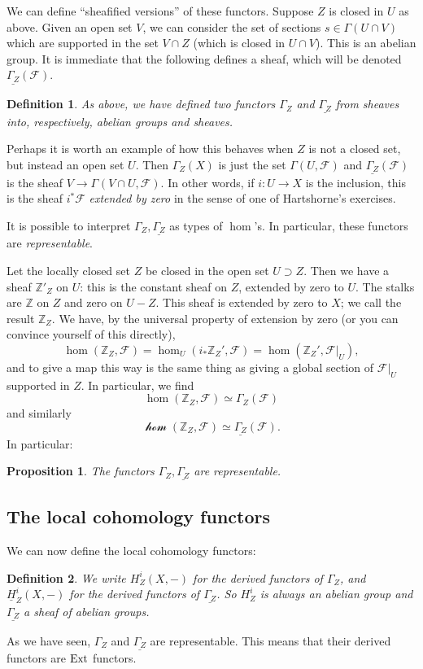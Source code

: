 \documentclass{article}
\newtheorem{definition}{Definition}
\newtheorem{proposition}{Proposition}
\begin{document}
We can define ``sheafified versions'' of these functors. Suppose $Z$ is closed
in $U$ as above.
Given an open set $V$, we can consider the set of sections $s \in \Gamma(U \cap
V)$ which are supported in the set $V \cap Z$ (which is closed in $U \cap V$).
This is an abelian group. It is immediate that the following defines a sheaf,
which will be denoted $\underline{\Gamma_Z}(\mathcal{F})$.

\begin{definition} 
As above, we have defined two functors $\Gamma_Z$ and $\underline{\Gamma_Z}$
from sheaves into, respectively, abelian groups and sheaves.
\end{definition} 

Perhaps it is worth an example of how this behaves when $Z$ is not a closed
set, but instead an open set $U$. Then $\Gamma_Z(X)$ is just the set $\Gamma(U,
\mathcal{F})$ and $\underline{\Gamma_Z}(\mathcal{F})$ is the sheaf $V \to
\Gamma_{}(V \cap U, \mathcal{F})$. In other words, if $i: U \to X$ is the
inclusion, this is the sheaf $ i^* \mathcal{F}$ \emph{extended by zero} in
the sense of one of Hartshorne's exercises. 

It is possible to interpret $\Gamma_Z, \underline{\Gamma_Z}$ as types of
$\hom$'s. In particular, these functors are \emph{representable}.

Let the locally closed set $Z $ be closed in the open set $U \supset Z$. Then
we have a sheaf $\mathbb{Z}'_Z$ on $U$: this is the constant sheaf on $Z$,
extended by zero to $U$. The stalks are $\mathbb{Z}$ on $Z$ and zero on $U -
Z$. This sheaf is extended by zero to $X$; we call the result
$\mathbb{Z}_Z$.  
We have, by the universal property of extension by zero (or you can convince
yourself of this directly),
\[ \hom(\mathbb{Z}_Z, \mathcal{F}) = \hom_U(i_* \mathbb{Z}_Z', \mathcal{F})
= \hom(  \mathbb{Z}_Z', \mathcal{F}|_U),\]
and to give a map this way is the same thing as giving a global section of
$\mathcal{F}|_U$ supported in $Z$. In particular, we find
\[ \hom(\mathbb{Z}_Z, \mathcal{F}) \simeq \Gamma_Z(\mathcal{F})  \]
and similarly
\[ \mathcal{\hom}(\mathbb{Z}_Z, \mathcal{F}) \simeq
\underline{\Gamma_Z}(\mathcal{F}) . \]
In particular:
\begin{proposition} 
The functors $\Gamma_Z, \underline{\Gamma_Z}$ are representable.
\end{proposition} 

\subsection{The local cohomology functors}

We can now define the local cohomology functors:
\begin{definition} 
We write $H^i_Z(X, -)$ for the derived functors of $\Gamma_Z$, and
$\underline{H}^i_Z(X, -)$ for the derived functors of $\underline{\Gamma_Z}$.
So $H^i_Z$ is always an abelian group and $\underline{\Gamma_Z}$ a sheaf of
abelian groups. 
\end{definition} 

As we have seen, $\Gamma_Z$ and $\underline{\Gamma_Z}$ are representable. This
means that their derived functors are $\mathrm{Ext}$ functors.
\end{document}
